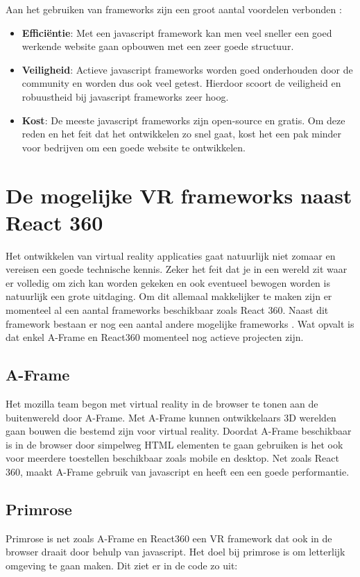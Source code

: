 Aan het gebruiken van frameworks zijn een groot aantal voordelen verbonden \autocite{Korotya2018}:

\begin{itemize}
	\item \textbf{Efficiëntie}: Met een javascript framework kan men veel sneller een goed werkende website gaan opbouwen met een zeer goede structuur.
	\item \textbf{Veiligheid}: Actieve javascript frameworks worden goed onderhouden door de community en worden dus ook veel getest. Hierdoor scoort de veiligheid en robuustheid bij javascript frameworks zeer hoog.
	\item \textbf{Kost}: De meeste javascript frameworks zijn open-source en gratis. Om deze reden en het feit dat het ontwikkelen zo snel gaat, kost het een pak minder voor bedrijven om een goede website te ontwikkelen.
\end{itemize}

\section{De mogelijke VR frameworks naast React 360}
\label{sec:frameworks-alternatieven}
Het ontwikkelen van virtual reality applicaties gaat natuurlijk niet zomaar en vereisen een goede technische kennis. Zeker het feit dat je in een wereld zit waar er volledig om zich kan worden gekeken en ook eventueel bewogen worden is natuurlijk een grote uitdaging. Om dit allemaal makkelijker te maken zijn er momenteel al een aantal frameworks beschikbaar zoals React 360. Naast dit framework bestaan er nog een aantal andere mogelijke frameworks \autocite{UIUXLab2017}. Wat opvalt is dat enkel A-Frame en React360 momenteel nog actieve projecten zijn. 

\subsection{A-Frame}
\label{subsec:a-frame}
Het mozilla team begon met virtual reality in de browser te tonen aan de buitenwereld door A-Frame. Met A-Frame kunnen ontwikkelaars 3D werelden gaan bouwen die bestemd zijn voor virtual reality. Doordat A-Frame beschikbaar is in de browser door simpelweg HTML elementen te gaan gebruiken is het ook voor meerdere toestellen beschikbaar zoals mobile en desktop. Net zoals React 360, maakt A-Frame gebruik van javascript en heeft een een goede performantie.
 
\subsection{Primrose}
\label{subsec:primrose}
Primrose is net zoals A-Frame en React360 een VR framework dat ook in de browser draait door behulp van javascript. Het doel bij primrose is om letterlijk omgeving te gaan maken. Dit ziet er in de code zo uit:

